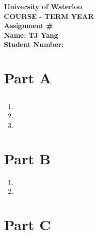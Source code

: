 \documentclass[12pt]{article}
\begin{document}
\begin{center}
{\Large\bf University of Waterloo}\\
\vspace{3mm}
{\Large\bf COURSE - TERM YEAR}\\
\vspace{2mm}
{\Large\bf Assignment #}\\
\vspace{3mm}
\textbf{Name: TJ Yang}\\
\textbf{Student Number:}
\end{center}

\section*{Part A}
\subsection{}
\begin{enumerate}[label=(\alph*)]
  \item
  \item
  \item
\end{enumerate}
\section*{Part B}
\begin{enumerate}
  \item
  \item
\end{enumerate}
\section*{Part C}
\end{document}
